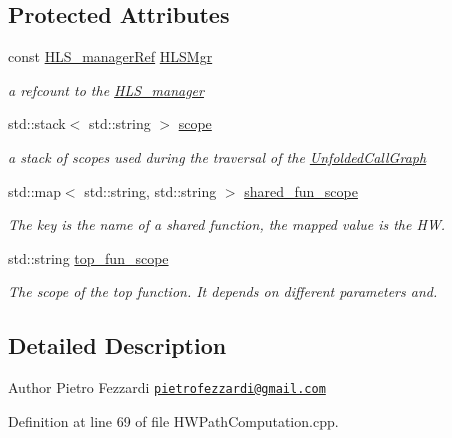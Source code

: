 \subsection*{Protected Attributes}
\begin{DoxyCompactItemize}
\item 
const \hyperlink{hls__manager_8hpp_acd3842b8589fe52c08fc0b2fcc813bfe}{H\+L\+S\+\_\+manager\+Ref} \hyperlink{classHWCallPathCalculator_a232983d5550599d833b9dc14333a1b1f}{H\+L\+S\+Mgr}
\begin{DoxyCompactList}\small\item\em a refcount to the \hyperlink{classHLS__manager}{H\+L\+S\+\_\+manager} \end{DoxyCompactList}\item 
std\+::stack$<$ std\+::string $>$ \hyperlink{classHWCallPathCalculator_af8a6a9326069aabe7c4794d27d050cff}{scope}
\begin{DoxyCompactList}\small\item\em a stack of scopes used during the traversal of the \hyperlink{classUnfoldedCallGraph}{Unfolded\+Call\+Graph} \end{DoxyCompactList}\item 
std\+::map$<$ std\+::string, std\+::string $>$ \hyperlink{classHWCallPathCalculator_a1c46c538712d447372be06463edcfae0}{shared\+\_\+fun\+\_\+scope}
\begin{DoxyCompactList}\small\item\em The key is the name of a shared function, the mapped value is the HW. \end{DoxyCompactList}\item 
std\+::string \hyperlink{classHWCallPathCalculator_a903a1ffb11ea45f207eb363e64e73b7a}{top\+\_\+fun\+\_\+scope}
\begin{DoxyCompactList}\small\item\em The scope of the top function. It depends on different parameters and. \end{DoxyCompactList}\end{DoxyCompactItemize}


\subsection{Detailed Description}
\begin{DoxyAuthor}{Author}
Pietro Fezzardi \href{mailto:pietrofezzardi@gmail.com}{\tt pietrofezzardi@gmail.\+com} 
\end{DoxyAuthor}


Definition at line 69 of file H\+W\+Path\+Computation.\+cpp.




